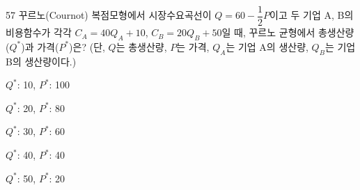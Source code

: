 \begin{question}{57}
꾸르노(Cournot) 복점모형에서 시장수요곡선이 $Q = 60 - \dfrac{1}{2}P$이고 두 기업 A, B의 비용함수가 각각 $C_A = 40Q_A + 10$, $C_B = 20Q_B + 50$일 때, 꾸르노 균형에서 총생산량($Q^*$)과 가격($P^*$)은? (단, $Q$는 총생산량, $P$는 가격, $Q_A$는 기업 A의 생산량, $Q_B$는 기업 B의 생산량이다.)
\begin{choices}
  \item $Q^*$: 10, $P^*$: 100
  \item $Q^*$: 20, $P^*$: 80
  \item $Q^*$: 30, $P^*$: 60
  \item $Q^*$: 40, $P^*$: 40
  \item $Q^*$: 50, $P^*$: 20
\end{choices}
\end{question}
